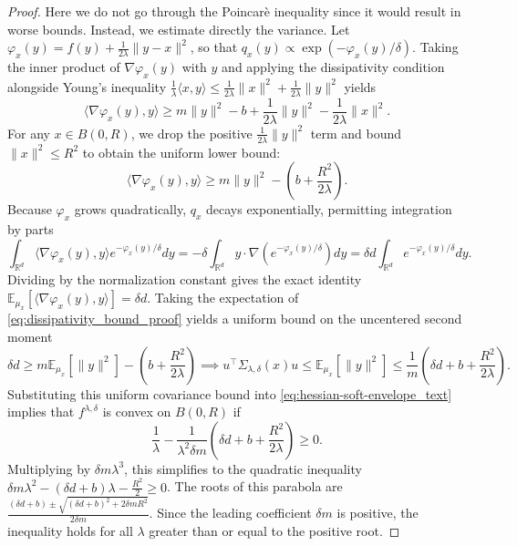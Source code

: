 \documentclass{article}
\begin{document}
\begin{proof} Here we do not go through the Poincarè inequality since it would result in worse bounds. Instead, we estimate directly the variance. Let $\varphi_x(y) = f(y) + \frac{1}{2\lambda}\|y-x\|^2$, so that $q_x(y) \propto \exp(-\varphi_x(y)/\delta)$. Taking the inner product of $\nabla \varphi_x(y)$ with $y$ and applying the dissipativity condition alongside Young's inequality $\frac{1}{\lambda}\langle x, y \rangle \le \frac{1}{2\lambda}\|x\|^2 + \frac{1}{2\lambda}\|y\|^2$ yields
\[
\langle \nabla \varphi_x(y), y \rangle \ge m\|y\|^2 - b + \frac{1}{2\lambda}\|y\|^2 - \frac{1}{2\lambda}\|x\|^2.
\]
For any $x \in B(0, R)$, we drop the positive $\frac{1}{2\lambda}\|y\|^2$ term and bound $\|x\|^2 \le R^2$ to obtain the uniform lower bound:
\begin{equation}\label{eq:dissipativity_bound_proof}
\langle \nabla \varphi_x(y), y \rangle \ge m\|y\|^2 - \left( b + \frac{R^2}{2\lambda} \right).
\end{equation}
Because $\varphi_x$ grows quadratically, $q_x$ decays exponentially, permitting integration by parts
\[
\int_{\mathbb{R}^d} \langle \nabla \varphi_x(y), y \rangle e^{-\varphi_x(y)/\delta} dy = -\delta \int_{\mathbb{R}^d} y \cdot \nabla \left( e^{-\varphi_x(y)/\delta} \right) dy = \delta d \int_{\mathbb{R}^d} e^{-\varphi_x(y)/\delta} dy.
\]
Dividing by the normalization constant gives the exact identity $\mathbb{E}_{\mu_x}[\langle \nabla \varphi_x(y), y \rangle] = \delta d$. Taking the expectation of \eqref{eq:dissipativity_bound_proof} yields a uniform bound on the uncentered second moment
\[
\delta d \ge m \mathbb{E}_{\mu_x}[\|y\|^2] - \left( b + \frac{R^2}{2\lambda} \right) \implies u^\top \Sigma_{\lambda,\delta}(x) u \le \mathbb{E}_{\mu_x}[\|y\|^2] \le \frac{1}{m}\left( \delta d + b + \frac{R^2}{2\lambda} \right).
\]
Substituting this uniform covariance bound into \eqref{eq:hessian-soft-envelope_text} implies that $f^{\lambda,\delta}$ is convex on $B(0,R)$ if
\[
\frac{1}{\lambda} - \frac{1}{\lambda^2\delta m}\left( \delta d + b + \frac{R^2}{2\lambda} \right) \ge 0.
\]
Multiplying by $\delta m \lambda^3$, this simplifies to the quadratic inequality $\delta m \lambda^2 - (\delta d + b)\lambda - \frac{R^2}{2} \ge 0$. The roots of this parabola are $\frac{(\delta d + b) \pm \sqrt{(\delta d + b)^2 + 2\delta m R^2}}{2\delta m}$. Since the leading coefficient $\delta m$ is positive, the inequality holds for all $\lambda$ greater than or equal to the positive root.
\end{proof}
\end{document}
